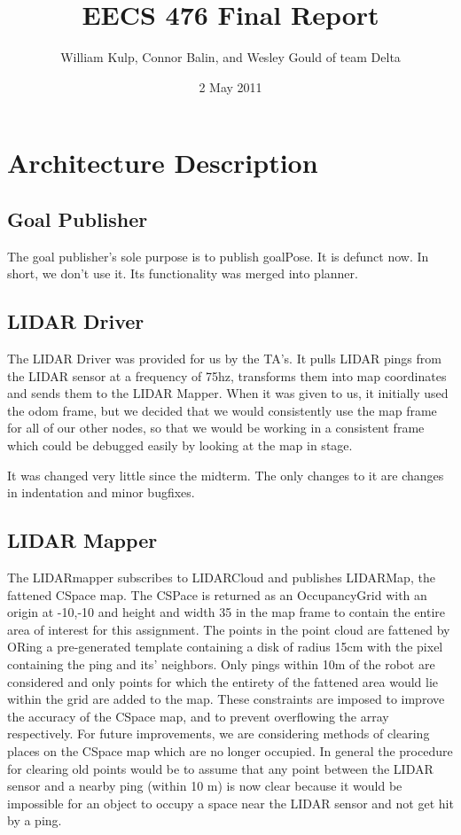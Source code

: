 \documentclass{article}
\author{William Kulp, Connor Balin, and Wesley Gould of team Delta}
\title{EECS 476 Final Report}
\date{2 May 2011}
\begin{document}
\maketitle

\small
\section{Architecture Description}

\subsection{Goal Publisher}

The goal publisher's sole purpose is to publish goalPose.
It is defunct now.
In short, we don't use it.
Its functionality was merged into planner.


\subsection{LIDAR Driver}

The LIDAR Driver was provided for us by the TA's.
It pulls LIDAR pings from the LIDAR sensor at a frequency of 75hz, transforms them into map coordinates and sends them to the LIDAR Mapper.
When it was given to us, it initially used the odom frame, but we decided that we would consistently use the map frame for all of our other nodes, so that we would be working in a consistent frame which could be debugged easily by looking at the map in stage.

It was changed very little since the midterm. The only changes to it are changes in indentation and minor bugfixes.


\subsection{LIDAR Mapper}

The LIDARmapper subscribes to LIDARCloud and publishes LIDARMap, the fattened CSpace map.
The CSPace is returned as an OccupancyGrid with an origin at -10,-10 and height and width 35 in the map frame to contain the entire area of interest for this assignment.
The points in the point cloud are fattened by ORing a pre-generated template containing a disk of radius 15cm with the pixel containing the ping and its' neighbors.
Only pings within 10m of the robot are considered and only points for which the entirety of the fattened area would lie within the grid are added to the map.
These constraints are imposed to improve the accuracy of the CSpace map, and to prevent overflowing the array respectively.
For future improvements, we are considering methods of clearing places on the CSpace map which are no longer occupied.
In general the procedure for clearing old points would be to assume that any point between the LIDAR sensor and a nearby ping (within 10 m) is now clear because it would be impossible for an object to occupy a space near the LIDAR sensor and not get hit by a ping.
\end{document}
